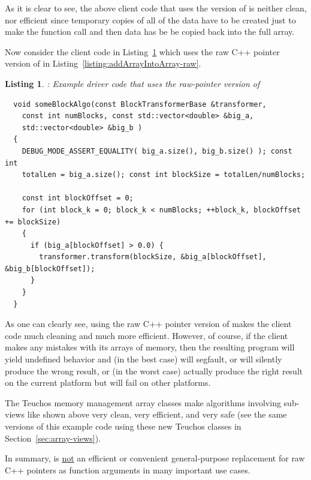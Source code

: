 \documentclass[pdf,ps2pdf,11pt]{SANDreport}
\newtheorem{listing}{Listing}
\begin{document}
As it is clear to see, the above client code that uses the
{} version of {} is
neither clean, nor efficient since temporary copies of all of the data
have to be created just to make the function call and then data has be
be copied back into the full array.

Now consider the client code in
Listing~\ref{listing:someBlockAlgo-std-vector-raw-ptr} which uses the
raw C++ pointer version of {} in
Listing~\ref{listing:addArrayIntoArray-raw}.

{}\begin{listing}: Example driver code that uses the raw-pointer
version of {}
\label{listing:someBlockAlgo-std-vector-raw-ptr}
{\small\begin{verbatim}
  void someBlockAlgo(const BlockTransformerBase &transformer,
    const int numBlocks, const std::vector<double> &big_a,
    std::vector<double> &big_b )
  {
    DEBUG_MODE_ASSERT_EQUALITY( big_a.size(), big_b.size() ); const int
    totalLen = big_a.size(); const int blockSize = totalLen/numBlocks;
    
    const int blockOffset = 0;
    for (int block_k = 0; block_k < numBlocks; ++block_k, blockOffset += blockSize)
    {
      if (big_a[blockOffset] > 0.0) {
        transformer.transform(blockSize, &big_a[blockOffset], &big_b[blockOffset]);
      }
    }
  }
\end{verbatim}}
\end{listing}

As one can clearly see, using the raw C++ pointer version of
{} makes the client code much cleaning and much
more efficient.  However, of course, if the client makes any mistakes
with its arrays of memory, then the resulting program will yield
undefined behavior and (in the best case) will segfault, or will
silently produce the wrong result, or (in the worst case) actually
produce the right result on the current platform but will fail on
other platforms.

The Teuchos memory management array classes make algorithms involving
sub-views like shown above very clean, very efficient, and very safe
(see the same versions of this example code using these new Teuchos
classes in Section~\ref{sec:array-views}).

In summary, {} is {}\underline{not} an efficient
or convenient general-purpose replacement for raw C++ pointers as
function arguments in many important use cases.
\end{document}
